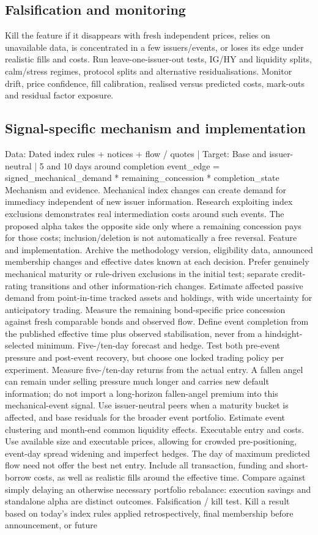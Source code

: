 \documentclass[10pt]{article}
\begin{document}
\subsection{Falsification and monitoring}
Kill the feature if it disappears with fresh independent prices, relies on unavailable data, is concentrated in a few issuers/events, or loses its edge under realistic fills and costs. Run leave-one-issuer-out tests, IG/HY and liquidity splits, calm/stress regimes, protocol splits and alternative residualisations. Monitor drift, price confidence, fill calibration, realised versus predicted costs, mark-outs and residual factor exposure.
\subsection{Signal-specific mechanism and implementation}
Data: Dated index rules + notices + flow / quotes  |  Target: Base and issuer-neutral  |  5 and 10 days around completion event\_edge = signed\_mechanical\_demand * remaining\_concession * completion\_state Mechanism and evidence.  Mechanical index changes can create demand for immediacy independent of new issuer information. Research exploiting index exclusions demonstrates real intermediation costs around such events. The proposed alpha takes the opposite side only where a remaining concession pays for those costs; inclusion/deletion is not automatically a free reversal. Feature and implementation.  Archive the methodology version, eligibility data, announced membership changes and effective dates known at each decision. Prefer genuinely mechanical maturity or rule-driven exclusions in the initial test; separate credit-rating transitions and other information-rich changes. Estimate affected passive demand from point-in-time tracked assets and holdings, with wide uncertainty for anticipatory trading. Measure the remaining bond-specific price concession against fresh comparable bonds and observed flow. Define event completion from the published effective time plus observed stabilisation, never from a hindsight-selected minimum. Five-/ten-day forecast and hedge.  Test both pre-event pressure and post-event recovery, but choose one locked trading policy per experiment. Measure five-/ten-day returns from the actual entry. A fallen angel can remain under selling pressure much longer and carries new default information; do not import a long-horizon fallen-angel premium into this mechanical-event signal. Use issuer-neutral peers when a maturity bucket is affected, and base residuals for the broader event portfolio. Estimate event clustering and month-end common liquidity effects. Executable entry and costs.  Use available size and executable prices, allowing for crowded pre-positioning, event-day spread widening and imperfect hedges. The day of maximum predicted flow need not offer the best net entry. Include all transaction, funding and short-borrow costs, as well as realistic fills around the effective time. Compare against simply delaying an otherwise necessary portfolio rebalance: execution savings and standalone alpha are distinct outcomes. Falsification / kill test.  Kill a result based on today’s index rules applied retrospectively, final membership before announcement, or future 
\end{document}
